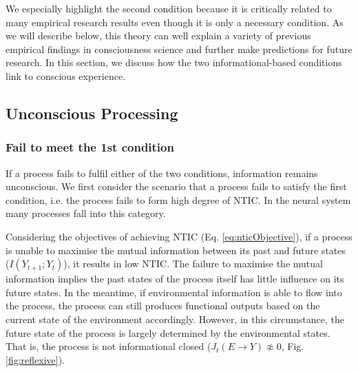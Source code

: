\documentclass[utf8]{article}
\begin{document}
        We especially highlight the second condition because it is critically related to many empirical research results even though it is only a necessary condition. As we will describe below, this theory can well explain a variety of previous empirical findings in consciousness science and further make predictions for future research. In this section, we discuss how the two informational-based conditions link to conscious experience. 
		
		
		
        \subsection{Unconscious Processing}
        
        \subsubsection*{Fail to meet the 1\lowercase{st} condition}
            If a process fails to fulfil either of the two conditions, information remains unconscious. We first consider the scenario that a process fails to satisfy the first condition, i.e. the process fails to form high degree of NTIC. In the neural system many processes fall into this category. 
        	
        	Considering the objectives of achieving NTIC (Eq. \ref{eq:nticObjective}), if a process is unable to maximise the mutual information between its past and future states ($I(Y_{t+1};Y_{t})$), it results in low NTIC. The failure to maximise the mutual information implies the past states of the process itself has little influence on its future states. In the meantime, if environmental information is able to flow into the process, the process can still produces functional outputs based on the current state of the environment accordingly. However, in this circumstance, the future state of the process is largely determined by the environmental states. That is, the process is not informational closed (${J_{t}(E \rightarrow Y )} \not\approx 0$, Fig.\ref{fig:reflexive}). 
            	
            	
                
\end{document}
